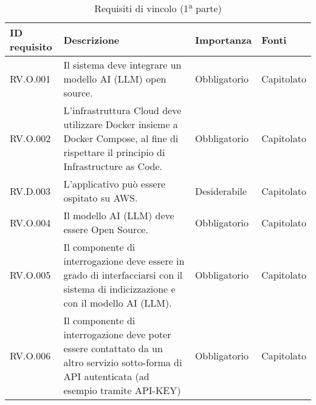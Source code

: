 \begin{table}[H]
\centering
    \begin{tabular}{|C{2.7cm}|L{7.2cm}|C{2.7cm}|C{2cm}|}
        \hline
    \textbf{ID requisito} & \textbf{Descrizione} & \textbf{Importanza} & \textbf{Fonti}  \\
    \hline
           RV.O.001 & Il sistema deve integrare un modello AI (LLM) open source. & Obbligatorio & Capitolato \\
          \hline 
          RV.O.002 & L’infrastruttura Cloud deve utilizzare Docker insieme a Docker Compose, al fine di rispettare il principio di Infrastructure as Code. & Obbligatorio & Capitolato \\
           \hline
          RV.D.003 & L'applicativo può essere ospitato su AWS. & Desiderabile & Capitolato \\
          \hline
          RV.O.004 & Il modello AI (LLM) deve essere Open Source.
         & Obbligatorio & Capitolato \\
        \hline
        RV.O.005 & Il componente di interrogazione deve essere in grado di interfacciarsi con il sistema di indicizzazione e con il modello AI (LLM).
         & Obbligatorio & Capitolato \\
        \hline
        RV.O.006 & Il componente di interrogazione deve poter essere contattato da un altro servizio sotto-forma di API autenticata (ad esempio tramite API-KEY)
         & Obbligatorio & Capitolato \\
         \hline
    \end{tabular}
    \caption{Requisiti di vincolo (1\textsuperscript{a}  parte)}
\end{table}
